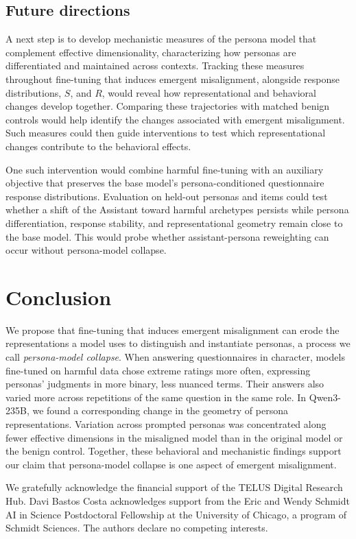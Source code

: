 \documentclass{article}
\begin{document}
\subsection{Future directions}
\label{sec:future}

A next step is to develop mechanistic measures of the persona model that complement effective dimensionality, characterizing how personas are differentiated and maintained across contexts. Tracking these measures throughout fine-tuning that induces emergent misalignment, alongside response distributions, $S$, and $R$, would reveal how representational and behavioral changes develop together. Comparing these trajectories with matched benign controls would help identify the changes associated with emergent misalignment. Such measures could then guide interventions to test which representational changes contribute to the behavioral effects.

One such intervention would combine harmful fine-tuning with an auxiliary objective that preserves the base model's persona-conditioned questionnaire response distributions. Evaluation on held-out personas and items could test whether a shift of the Assistant toward harmful archetypes persists while persona differentiation, response stability, and representational geometry remain close to the base model. This would probe whether assistant-persona reweighting can occur without persona-model collapse.

\section{Conclusion}
\label{sec:conclusion}

We propose that fine-tuning that induces emergent misalignment can erode the representations a model uses to distinguish and instantiate personas, a process we call \emph{persona-model collapse}. When answering questionnaires in character, models fine-tuned on harmful data chose extreme ratings more often, expressing personas' judgments in more binary, less nuanced terms. Their answers also varied more across repetitions of the same question in the same role. In Qwen3-235B, we found a corresponding change in the geometry of persona representations. Variation across prompted personas was concentrated along fewer effective dimensions in the misaligned model than in the original model or the benign control. Together, these behavioral and mechanistic findings support our claim that persona-model collapse is one aspect of emergent misalignment.

\clearpage
\begin{ack}
We gratefully acknowledge the financial support of the TELUS Digital Research Hub.
Davi Bastos Costa acknowledges support from the Eric and Wendy Schmidt AI in Science Postdoctoral Fellowship at the University of Chicago, a program of Schmidt Sciences.
The authors declare no competing interests.
\end{ack}




\clearpage


\clearpage

\end{document}
